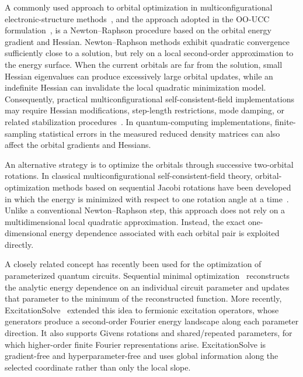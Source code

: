 \documentclass[
 reprint,
 amsmath,amssymb,
 aps,
 physrev,
]{revtex4-2}
\begin{document}
A commonly used approach to orbital optimization in multiconfigurational electronic-structure methods~\cite{siegbahn1980,siegbahn1981,szalay2012,fossotande2016}, and the approach adopted in the OO-UCC formulation~\cite{mizukami2020}, is a Newton--Raphson procedure based on the orbital energy gradient and Hessian. Newton--Raphson methods exhibit quadratic convergence sufficiently close to a solution, but rely on a local second-order approximation to the energy surface.
When the current orbitals are far from the solution, small Hessian eigenvalues can produce excessively large orbital updates, while an indefinite Hessian can invalidate the local quadratic minimization model. Consequently, practical multiconfigurational self-consistent-field implementations may require Hessian modifications, step-length restrictions, mode damping, or related stabilization procedures~\cite{werner1980,siegbahn1981,yeager1982}.
In quantum-computing implementations, finite-sampling statistical errors in the measured reduced density matrices can also affect the orbital gradients and Hessians.

An alternative strategy is to optimize the orbitals through successive two-orbital rotations. In classical multiconfigurational self-consistent-field theory, orbital-optimization methods based on sequential Jacobi rotations have been developed in which the energy is minimized with respect to one rotation angle at a time~\cite{ivanic2003}.
Unlike a conventional Newton--Raphson step, this approach does not rely on a multidimensional local quadratic approximation. Instead, the exact one-dimensional energy dependence associated with each orbital pair is exploited directly.

A closely related concept has recently been used for the optimization of parameterized quantum circuits. Sequential minimal optimization~\cite{nakanishi2020} reconstructs the analytic energy dependence on an individual circuit parameter and updates that parameter to the minimum of the reconstructed function.
More recently, ExcitationSolve~\cite{jager2025} extended this idea to fermionic excitation operators, whose generators produce a second-order Fourier energy landscape along each parameter direction. It also supports Givens rotations and shared/repeated parameters, for which higher-order finite Fourier representations arise.
ExcitationSolve is gradient-free and hyperparameter-free and uses global information along the selected coordinate rather than only the local slope.
\end{document}
